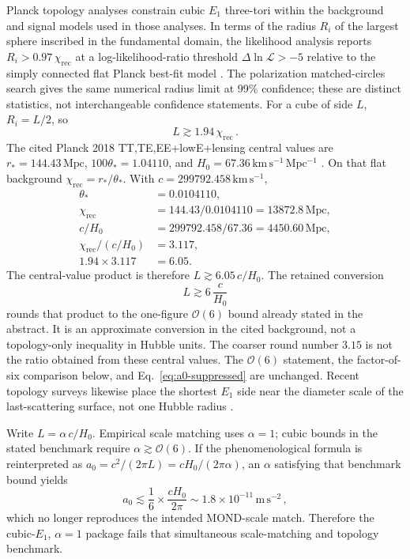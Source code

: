 \documentclass[aps,prd,reprint,superscriptaddress,nofootinbib,floatfix,showkeys]{revtex4-2}
\newcommand{\azero}{a_{0}}
\newcommand{\Hzero}{H_{0}}
\begin{document}
Planck topology analyses constrain cubic \(E_1\) three-tori within the
background and signal models used in those analyses. In terms of the radius
\(R_i\) of the largest sphere inscribed in the fundamental domain, the
likelihood analysis reports \(R_i>0.97\,\chi_{\mathrm{rec}}\) at a
log-likelihood-ratio threshold \(\Delta\ln\mathcal L>-5\) relative to the
simply connected flat Planck best-fit model \cite{planck_topology}.
The polarization matched-circles search gives the same numerical radius
limit at 99\% confidence; these are distinct statistics, not interchangeable
confidence statements. For a cube of side \(L\),
\(R_i=L/2\), so
\begin{equation}
  L \gtrsim 1.94\,\chi_{\mathrm{rec}}\,.
  \label{eq:L-chi}
\end{equation}
The cited Planck 2018 TT,TE,EE+lowE+lensing central values are
\(r_*=144.43\,\mathrm{Mpc}\), \(100\theta_*=1.04110\), and
\(\Hzero=67.36\,\mathrm{km\,s^{-1}\,Mpc^{-1}}\) \cite{planck}.
On that flat background
\(\chi_{\mathrm{rec}}=r_*/\theta_*\). With
\(c=299792.458\,\mathrm{km\,s^{-1}}\),
\begin{align*}
\theta_* &= 0.0104110,\\
\chi_{\mathrm{rec}}
 &= 144.43/0.0104110 = 13872.8\,\mathrm{Mpc},\\
c/\Hzero
 &= 299792.458/67.36 = 4450.60\,\mathrm{Mpc},\\
\chi_{\mathrm{rec}}/(c/\Hzero) &= 3.117,\\
1.94\times 3.117 &= 6.05.
\end{align*}
The central-value product is therefore
\(L\gtrsim 6.05\,c/\Hzero\). The retained conversion
\begin{equation}
  L \gtrsim 6\,\frac{c}{\Hzero}
  \label{eq:L-H}
\end{equation}
rounds that product to the one-figure \(\mathcal{O}(6)\) bound already
stated in the abstract. It is an approximate conversion in the cited
background, not a topology-only inequality in Hubble units. The coarser
round number \(3.15\) is not the ratio obtained from these central values.
The \(\mathcal{O}(6)\) statement, the factor-of-six comparison below, and
Eq.~\eqref{eq:a0-suppressed} are unchanged. Recent topology surveys likewise place the shortest
\(E_1\) side near the diameter scale of the last-scattering surface, not one
Hubble radius \cite{compact_promise,planck_topology}.

Write \(L=\alpha\,c/\Hzero\).  Empirical scale matching uses \(\alpha=1\);
cubic bounds in the stated benchmark require \(\alpha\gtrsim\mathcal{O}(6)\). If the phenomenological
formula is reinterpreted as \(\azero=c^{2}/(2\pi L)=c\Hzero/(2\pi\alpha)\),
an \(\alpha\) satisfying that benchmark bound yields
\begin{equation}
  \azero \lesssim \frac{1}{6}\times\frac{c\Hzero}{2\pi}
  \sim 1.8\times 10^{-11}\,\mathrm{m\,s^{-2}}\,,
  \label{eq:a0-suppressed}
\end{equation}
which no longer reproduces the intended MOND-scale match.  Therefore the
cubic-\(E_1\), \(\alpha=1\) package fails that simultaneous scale-matching
and topology benchmark.
\end{document}
